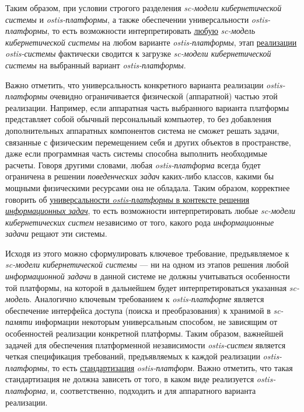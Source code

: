 Таким образом, при условии строгого разделения \textit{sc-модели кибернетической системы} и \textit{ostis-платформы}, а также обеспечении универсальности \textit{ostis-платформы}, то есть возможности интерпретировать \uline{любую} \textit{sc-модель кибернетической системы} на любом варианте \textit{ostis-платформы}, этап \uline{реализации} \textit{ostis-системы} фактически сводится к загрузке \textit{sc-модели кибернетической системы} на выбранный вариант \textit{ostis-платформы}.

Важно отметить, что универсальность конкретного варианта реализации \textit{ostis-платформы} очевидно ограничивается физической (аппаратной) частью этой реализации. Например, если аппаратная часть выбранного варианта платформы представляет собой обычный персональный компьютер, то без добавления дополнительных аппаратных компонентов система не сможет решать задачи, связанные с физическим перемещением себя и других объектов в пространстве, даже если программная часть системы способна выполнить необходимые расчеты. Говоря другими словами, любая \textit{ostis-платформа} всегда будет ограничена в решении \textit{поведенческих задач} каких-либо классов, какими бы мощными физическими ресурсами она не обладала. Таким образом, корректнее говорить об \uline{универсальности \textit{ostis-платформы} в контексте решения \textit{информационных задач}}, то есть возможности интерпретировать любые \textit{sc-модели кибернетических систем} независимо от того, какого рода \textit{информационные задачи} рещают эти системы. 

Исходя из этого можно сформулировать ключевое требование, предъявляемое к \textit{sc-модели кибернетической системы} --- ни на одном из этапов решения любой \textit{информационной задачи} в данной системе не должны учитываться особенности той платформы, на которой в дальнейшем будет интерпретироваться указанная \textit{sc-модель}. Аналогично ключевым требованием к \textit{ostis-платформе} является обеспечение интерфейса доступа (поиска и преобразования) к хранимой в \textit{sc-памяти} информации некоторым универсальным способом, не зависящим от особенностей реализации конкретной платформы. Таким образом, важнейшей задачей для обеспечения платформенной независимости \textit{ostis-систем} является четкая спецификация требований, предъявляемых к каждой реализации \textit{ostis-платформы}, то есть \uline{стандартизация} \textit{ostis-платформ}. Важно отметить, что такая стандартизация не должна зависеть от того, в каком виде реализуется \textit{ostis-платформа}, и, соответственно, подходить и для аппаратного варианта реализации.

